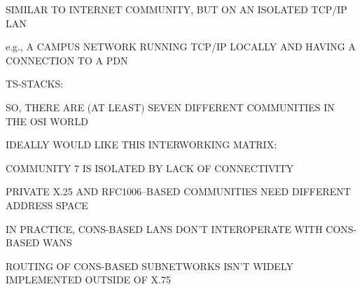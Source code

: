 \begin{bwslide}

\begin{nrtc}
\item	SIMILAR TO INTERNET COMMUNITY,
	BUT ON AN ISOLATED TCP/IP LAN
    \begin{nrtc}
    \item	e.g., A CAMPUS NETWORK RUNNING TCP/IP LOCALLY AND HAVING A
		CONNECTION TO A PDN
    \end{nrtc}

\item	TS-STACKS:
\end{nrtc}

\end{bwslide}


\begin{bwslide}

\begin{nrtc}
\item	SO, THERE ARE (AT LEAST) SEVEN DIFFERENT COMMUNITIES IN THE OSI WORLD

\item	IDEALLY WOULD LIKE THIS INTERWORKING MATRIX:
\end{nrtc}

\end{bwslide}


\begin{bwslide}

\begin{nrtc}
\item	COMMUNITY 7 IS ISOLATED BY LACK OF CONNECTIVITY
\end{nrtc}

\end{bwslide}


\begin{bwslide}

\begin{nrtc}
\item	PRIVATE X.25 AND RFC1006--BASED COMMUNITIES NEED DIFFERENT ADDRESS
	SPACE
\end{nrtc}

\end{bwslide}


\begin{bwslide}

\begin{nrtc}
\item	IN PRACTICE, CONS-BASED LANS DON'T INTEROPERATE WITH CONS-BASED WANS 
    \begin{nrtc}
    \item	ROUTING OF CONS-BASED SUBNETWORKS ISN'T WIDELY IMPLEMENTED
		OUTSIDE OF X.75
    \end{nrtc}
\end{nrtc}

\end{bwslide}


